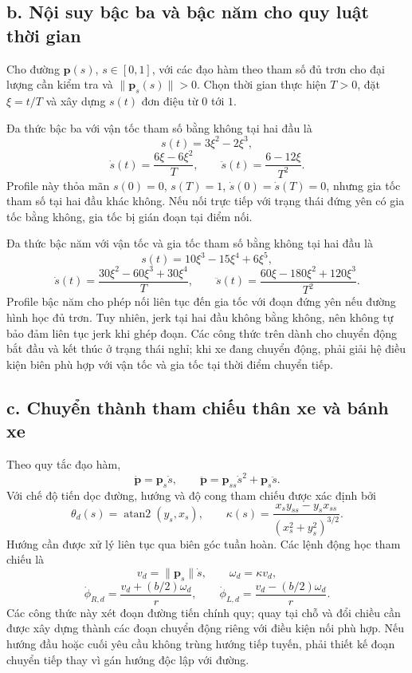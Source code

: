 \documentclass[12pt,a4paper,oneside]{report}
\begin{document}
\subsection*{b. Nội suy bậc ba và bậc năm cho quy luật thời gian}

Cho đường \(\mathbf p(s)\), \(s\in[0,1]\), với các đạo hàm theo tham số đủ trơn cho đại lượng cần kiểm tra và \(\|\mathbf p_s(s)\|>0\). Chọn thời gian thực hiện \(T>0\), đặt \(\xi=t/T\) và xây dựng \(s(t)\) đơn điệu từ \(0\) tới \(1\).

Đa thức bậc ba với vận tốc tham số bằng không tại hai đầu là
\[
  s(t)=3\xi^2-2\xi^3,
\]
\[
  \dot s(t)=\frac{6\xi-6\xi^2}{T},\qquad
  \ddot s(t)=\frac{6-12\xi}{T^2}.
\]
Profile này thỏa mãn \(s(0)=0\), \(s(T)=1\), \(\dot s(0)=\dot s(T)=0\), nhưng gia tốc tham số tại hai đầu khác không. Nếu nối trực tiếp với trạng thái đứng yên có gia tốc bằng không, gia tốc bị gián đoạn tại điểm nối.

Đa thức bậc năm với vận tốc và gia tốc tham số bằng không tại hai đầu là
\[
  s(t)=10\xi^3-15\xi^4+6\xi^5,
\]
\[
  \dot s(t)=\frac{30\xi^2-60\xi^3+30\xi^4}{T},\qquad
  \ddot s(t)=\frac{60\xi-180\xi^2+120\xi^3}{T^2}.
\]
Profile bậc năm cho phép nối liên tục đến gia tốc với đoạn đứng yên nếu đường hình học đủ trơn. Tuy nhiên, jerk tại hai đầu không bằng không, nên không tự bảo đảm liên tục jerk khi ghép đoạn. Các công thức trên dành cho chuyển động bắt đầu và kết thúc ở trạng thái nghỉ; khi xe đang chuyển động, phải giải hệ điều kiện biên phù hợp với vận tốc và gia tốc tại thời điểm chuyển tiếp.

\subsection*{c. Chuyển thành tham chiếu thân xe và bánh xe}

Theo quy tắc đạo hàm,
\[
  \dot{\mathbf p}=\mathbf p_s\dot s,\qquad
  \ddot{\mathbf p}=\mathbf p_{ss}\dot s^2+\mathbf p_s\ddot s.
\]
Với chế độ tiến dọc đường, hướng và độ cong tham chiếu được xác định bởi
\[
  \theta_d(s)=\operatorname{atan2}(y_s,x_s),\qquad
  \kappa(s)=\frac{x_s y_{ss}-y_s x_{ss}}
  {(x_s^2+y_s^2)^{3/2}}.
\]
Hướng cần được xử lý liên tục qua biên góc tuần hoàn. Các lệnh động học tham chiếu là
\[
  v_d=\|\mathbf p_s\|\dot s,\qquad
  \omega_d=\kappa v_d,
\]
\[
  \dot\phi_{R,d}=\frac{v_d+(b/2)\omega_d}{r},\qquad
  \dot\phi_{L,d}=\frac{v_d-(b/2)\omega_d}{r}.
\]
Các công thức này xét đoạn đường tiến chính quy; quay tại chỗ và đổi chiều cần được xây dựng thành các đoạn chuyển động riêng với điều kiện nối phù hợp. Nếu hướng đầu hoặc cuối yêu cầu không trùng hướng tiếp tuyến, phải thiết kế đoạn chuyển tiếp thay vì gán hướng độc lập với đường.
\end{document}
